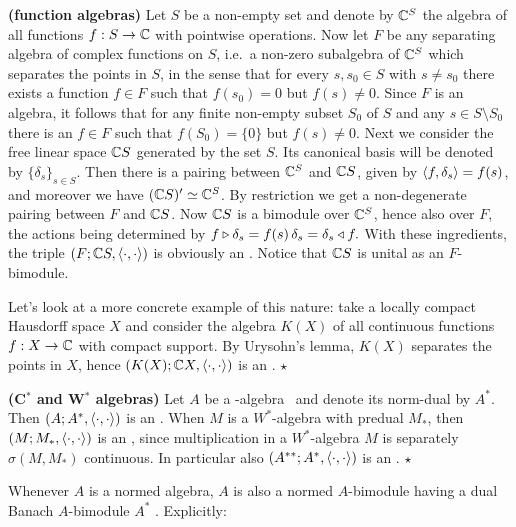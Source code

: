 \begin{exA} \label{exA:introduction} \rm
  {\bf (function algebras)} \hspace{0.6em}
  Let $S$ be a non-empty set and denote by $\mathbb{C}^S$ the algebra of all functions
  $f:S \rightarrow \mathbb{C}$ with pointwise operations.
  Now let $F$ be any separating algebra of complex functions on $S$,
  i.e.\ a non-zero subalgebra of $\mathbb{C}^S$ which separates the points in $S$,
  in the sense that for every $s,s_0 \in S$ with $s\neq s_0$ there exists
  a function $f\in F$ such that $f(s_0)=0$ but $f(s)\neq 0$.
  Since $F$ is an algebra, it follows that for any finite non-empty subset $S_0$
  of $S$ and any $s\in S\setminus S_0$ there is an $f\in F$ such that
  $f(S_0)=\{0\}$ but $f(s) \neq 0$\@.
  Next we consider the free linear space $\mathbb{C} S$ generated
  by the set $S$. Its canonical basis will be denoted
  by $\{\delta_s\}_{s\in S}$\@. Then there is a pairing between
  $\mathbb{C}^S$ and $\mathbb{C} S$, given by $\langle f,\delta_s \rangle = f(s)$,
  and moreover we have $(\mathbb{C} S)' \simeq \mathbb{C}^S$\@. By restriction
  we get a non-degenerate pairing between $F$ and $\mathbb{C} S$.
  Now $\mathbb{C} S$ is a bimodule over $\mathbb{C}^S$, hence also over $F$,
  the actions being determined by
  $ f \triangleright \delta_s = f(s) \,\delta_s = \delta_s \triangleleft f. $
  With these ingredients, the triple $(F; \mathbb{C} S, \langle\cdot, \cdot\rangle)$
  is obviously an \context\@. Notice that $\mathbb{C} S$ is unital
  as an $F$-bimodule.

  Let's look at a more concrete example of this nature: take
  a locally compact Hausdorff space $X$ and consider the algebra $K(X)$
  of all continuous functions $f:X\rightarrow\mathbb{C}$ with compact support.
  By Urysohn's lemma, $K(X)$ separates the points in $X$, hence
  $(K(X); \mathbb{C} X, \langle\cdot, \cdot\rangle)$ is an \context. \hfill $\star$
\end{exA}


\begin{exB} \label{exB:introduction} \rm
  {\bf (C$^*$ and W$^*$ algebras)} \hspace{0.6em}
  Let $A$ be a \Cstar-algebra \cite{Takesaki}\ and denote its
  norm-dual by $A^*$\@. Then $(A; A^*, \langle\cdot, \cdot\rangle)$ is an \context\@.
  When $M$ is a $W^*$-algebra with predual $M_*$, then
  $(M; M_*, \langle\cdot, \cdot\rangle)$ is an \context, since multiplication in a
  $W^*$-algebra $M$ is separately $\sigma(M,M_*)$ continuous.
  In particular also $(A^{**}; A^*, \langle\cdot, \cdot\rangle)$ is an \context.
  \hfill $\star$
\end{exB}


Whenever $A$ is a normed algebra, $A$ is also a normed $A$-bimodule having
a dual Banach $A$-bimodule $A^*$
\cite[\S I.9.12 and \S I.9.13.i-iv]{Bonsall_Duncan}\@. Explicitly:

